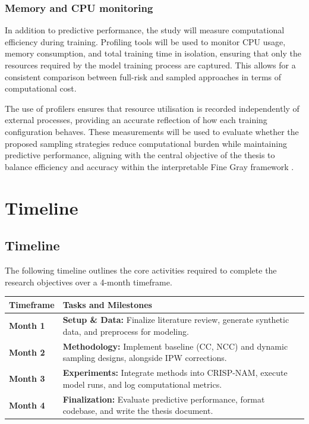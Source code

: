\documentclass[a4paper,twoside,12pt]{report}
\begin{document}
\subsection{Memory and CPU monitoring}
In addition to predictive performance, the study will measure computational efficiency during training. Profiling tools will be used to monitor CPU usage, memory consumption, and total training time in isolation, ensuring that only the resources required by the model training process are captured. This allows for a consistent comparison between full-risk and sampled approaches in terms of computational cost.

The use of profilers ensures that resource utilisation is recorded independently of external processes, providing an accurate reflection of how each training configuration behaves. These measurements will be used to evaluate whether the proposed sampling strategies reduce computational burden while maintaining predictive performance, aligning with the central objective of the thesis to balance efficiency and accuracy within the interpretable Fine Gray framework \cite{InterpretableFineGray2025}.
\chapter{Timeline}
\section{Timeline}

The following timeline outlines the core activities required to complete the research objectives over a 4-month timeframe.

\vspace{1em}
\noindent
\begin{tabular}{p{2.5cm} p{12.5cm}}
\toprule
\textbf{Timeframe} & \textbf{Tasks and Milestones} \\
\midrule
\textbf{Month 1} & \textbf{Setup \& Data:} Finalize literature review, generate synthetic data, and preprocess for modeling. \\
\textbf{Month 2} & \textbf{Methodology:} Implement baseline (CC, NCC) and dynamic sampling designs, alongside IPW corrections. \\
\textbf{Month 3} & \textbf{Experiments:} Integrate methods into CRISP-NAM, execute model runs, and log computational metrics. \\
\textbf{Month 4} & \textbf{Finalization:} Evaluate predictive performance, format codebase, and write the thesis document. \\
\bottomrule
\end{tabular}
\nocite{*}

\end{document}
